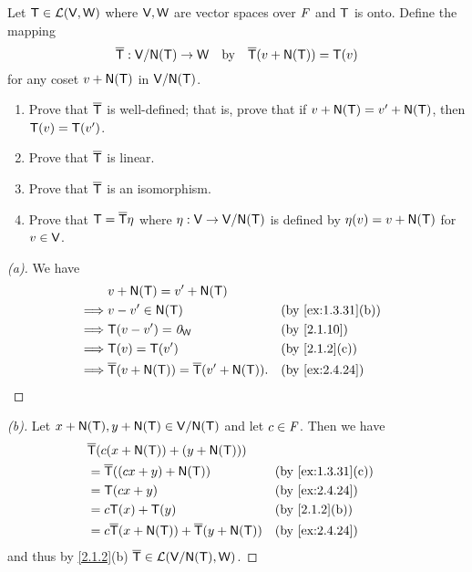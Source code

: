 \begin{ex}\label{ex:2.4.24}
	Let \(\mathsf{T} \in \mathcal{L}(\mathsf{V}, \mathsf{W})\) where \(\mathsf{V}, \mathsf{W}\) are vector spaces over \(\mathit{F}\) and \(\mathsf{T}\) is onto.
	Define the mapping
	\[
		\overline{\T} : \V / \ns{\T} \to \W \quad \text{by} \quad \overline{\T}(v + \ns{\T}) = \T(v)
	\]
	for any coset \(v + \ns{\T}\) in \(\V / \ns{\T}\).
	\begin{enumerate}
		\item Prove that \(\overline{\mathsf{T}}\) is well-defined;
		      that is, prove that if \(v + \ns{\T} = v' + \ns{\T}\), then \(\mathsf{T}(v) = \mathsf{T}(v')\).
		\item Prove that \(\overline{\mathsf{T}}\) is linear.
		\item Prove that \(\overline{\mathsf{T}}\) is an isomorphism.
		\item Prove that \(\mathsf{T} = \overline{\mathsf{T}} \eta\) where \(\eta : \V \to \V / \ns{\T}\) is defined by \(\eta(v) = v + \ns{\T}\) for \(v \in \mathsf{V}\).
	\end{enumerate}
\end{ex}

\begin{proof}[(a)]
	We have
	\begin{align*}
		         & v + \ns{\T} = v' + \ns{\T}                                                       \\
		\implies & v - v' \in \ns{\T}                                        &  & \by{ex:1.3.31}[b] \\
		\implies & \T(v - v') = \zv_{\W}                                     &  & \by{2.1.10}       \\
		\implies & \T(v) = \T(v')                                            &  & \by{2.1.2}[c]     \\
		\implies & \overline{\T}(v + \ns{\T}) = \overline{\T}(v' + \ns{\T}). &  & \by{ex:2.4.24}
	\end{align*}
\end{proof}

\begin{proof}[(b)]
	Let \(x + \ns{\T}, y + \ns{\T} \in \V / \ns{\T}\) and let \(c \in \mathit{F}\).
	Then we have
	\begin{align*}
		 & \overline{\T}(c (x + \ns{\T}) + (y + \ns{\T}))                                     \\
		 & = \overline{\T}((cx + y) + \ns{\T})                         &  & \by{ex:1.3.31}[c] \\
		 & = \T(cx + y)                                                &  & \by{ex:2.4.24}    \\
		 & = c \T(x) + \T(y)                                           &  & \by{2.1.2}[b]     \\
		 & = c \overline{\T}(x + \ns{\T}) + \overline{\T}(y + \ns{\T}) &  & \by{ex:2.4.24}
	\end{align*}
	and thus by \cref{2.1.2}(b) \(\overline{\T} \in \ls(\V / \ns{\T}, \W)\).
\end{proof}

